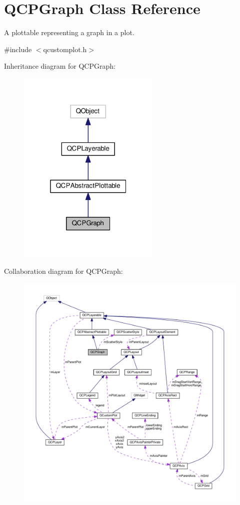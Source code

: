 \hypertarget{classQCPGraph}{}\section{Q\+C\+P\+Graph Class Reference}
\label{classQCPGraph}


A plottable representing a graph in a plot.  




{\ttfamily \#include $<$qcustomplot.\+h$>$}



Inheritance diagram for Q\+C\+P\+Graph\+:\nopagebreak
\begin{figure}[H]
\begin{center}
\leavevmode
\includegraphics[width=193pt]{classQCPGraph__inherit__graph}
\end{center}
\end{figure}


Collaboration diagram for Q\+C\+P\+Graph\+:\nopagebreak
\begin{figure}[H]
\begin{center}
\leavevmode
\includegraphics[width=350pt]{classQCPGraph__coll__graph}
\end{center}
\end{figure}
